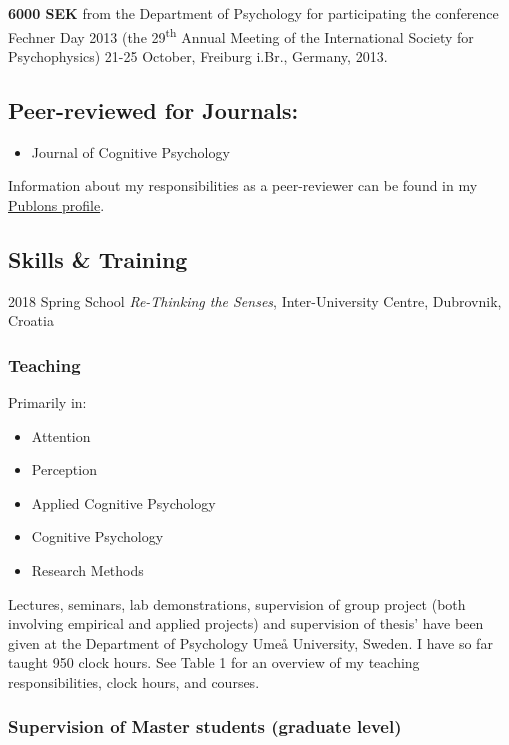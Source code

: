 \documentclass[]{article}
\providecommand{\tightlist}{%
  \setlength{\itemsep}{0pt}\setlength{\parskip}{0pt}}
\begin{document}
\textbf{6000 SEK} from the Department of Psychology for participating
the conference Fechner Day 2013 (the 29\textsuperscript{th} Annual
Meeting of the International Society for Psychophysics) 21-25 October,
Freiburg i.Br., Germany, 2013.

\subsection{Peer-reviewed for
Journals:}\label{peer-reviewed-for-journals}

\begin{itemize}
\tightlist
\item
  Journal of Cognitive Psychology
\end{itemize}

Information about my responsibilities as a peer-reviewer can be found in
my \href{https://www.publons.com/a/1517052/}{Publons profile}.

\subsection{Skills \& Training}\label{skills-training}

2018 Spring School \emph{Re-Thinking the Senses}, Inter-University
Centre, Dubrovnik, Croatia

\subsubsection{Teaching}\label{teaching}

Primarily in:

\begin{itemize}
\tightlist
\item
  Attention
\item
  Perception
\item
  Applied Cognitive Psychology
\item
  Cognitive Psychology
\item
  Research Methods
\end{itemize}

Lectures, seminars, lab demonstrations, supervision of group project
(both involving empirical and applied projects) and supervision of
thesis' have been given at the Department of Psychology Umeå University,
Sweden. I have so far taught 950 clock hours. See Table 1 for an
overview of my teaching responsibilities, clock hours, and courses.

\subsubsection{Supervision of Master students (graduate
level)}\label{supervision-of-master-students-graduate-level}
\end{document}
